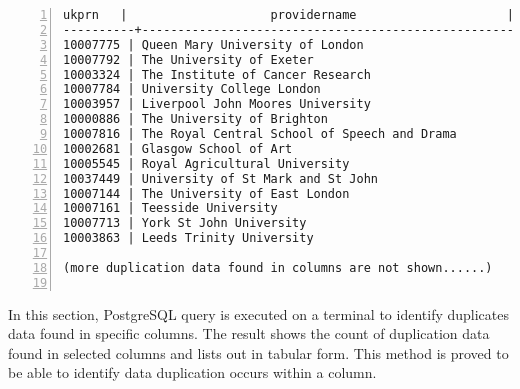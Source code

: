 \begin{lstlisting}[breaklines, frame=single, numbers=left, caption={Identify column uniqueness}, label=commandline-02]
ukprn   |                    providername                     |          region          | count 
----------+-----------------------------------------------------+--------------------------+-------
10007775 | Queen Mary University of London                     | London                   |   207
10007792 | The University of Exeter                            | South West               |   207
10003324 | The Institute of Cancer Research                    | London                   |   207
10007784 | University College London                           | London                   |   207
10003957 | Liverpool John Moores University                    | North West               |   207
10000886 | The University of Brighton                          | South East               |   207
10007816 | The Royal Central School of Speech and Drama        | London                   |   207
10002681 | Glasgow School of Art                               | Scotland                 |   207
10005545 | Royal Agricultural University                       | South West               |   207
10037449 | University of St Mark and St John                   | South West               |   207
10007144 | The University of East London                       | London                   |   207
10007161 | Teesside University                                 | North East               |   207
10007713 | York St John University                             | Yorkshire and the Humber |   207
10003863 | Leeds Trinity University                            | Yorkshire and the Humber |   207

(more duplication data found in columns are not shown......)


\end{lstlisting}

In this section, PostgreSQL query is executed on a terminal to identify duplicates data found in specific columns. The result shows the count of duplication data found in selected columns and lists out in tabular form. This method is proved to be able to identify data duplication occurs within a column. 





 




